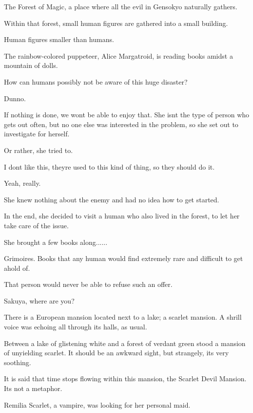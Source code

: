 \begin{tcolorbox}[breakable, colback=white, colframe=black!80,
  boxrule=0.6pt, arc=0mm, left=3mm, right=3mm, top=2mm, bottom=2mm]
The Forest of Magic, a place where all the evil in Gensokyo naturally gathers.\par
Within that forest, small human figures are gathered into a small building.\par
Human figures smaller than humans.\par
The rainbow-{}colored puppeteer, Alice Margatroid, is reading books amidst a mountain of dolls.\par
\textquotedbl{}How can humans possibly not be aware of this huge disaster?\textquotedbl{}\par
\textquotedbl{}Dunno.\textquotedbl{}\par
If nothing is done, we won\textquotesingle{}t be able to enjoy that. She isn\textquotesingle{}t the type of person who gets out often, but no one else was interested in the problem, so she set out to investigate for herself.\par
Or rather, she tried to.\par
\textquotedbl{}I don\textquotesingle{}t like this, they\textquotesingle{}re used to this kind of thing, so they should do it.\textquotedbl{}\par
\textquotedbl{}Yeah, really.\textquotedbl{}\par
She knew nothing about the enemy and had no idea how to get started.\par
In the end, she decided to visit a human who also lived in the forest, to let her take care of the issue.\par
She brought a few books along......\par
Grimoires. Books that any human would find extremely rare and difficult to get ahold of.\par
That person would never be able to refuse such an offer.\par
\medskip
\medskip
\textquotedbl{}Sakuya, where are you?\textquotedbl{}\par
There is a European mansion located next to a lake; a scarlet mansion. A shrill voice was echoing all through its halls, as usual.\par
Between a lake of glistening white and a forest of verdant green stood a mansion of unyielding scarlet. It should be an awkward sight, but strangely, it\textquotesingle{}s very soothing.\par
It is said that time stops flowing within this mansion, the Scarlet Devil Mansion. It\textquotesingle{}s not a metaphor.\par
Remilia Scarlet, a vampire, was looking for her personal maid.\par

\end{tcolorbox}
